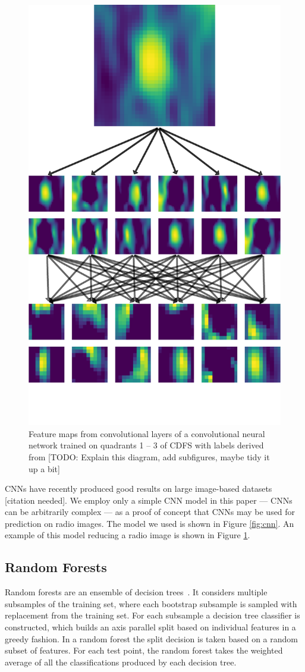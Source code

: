 \documentclass[fleqn,usenatbib,usedcolumn]{mnras}
\begin{document}
    \begin{figure}
    \centering
    \includegraphics[width=0.6\columnwidth]{convolutions_42191.pdf}
    \caption{Feature maps from convolutional layers of a convolutional neural
      network trained on quadrants 1 -- 3 of CDFS with labels derived from
      \citeauthor{norris06} [TODO: Explain this diagram, add subfigures, maybe tidy it up a bit]}
    \label{fig:cnn-outputs}
    \end{figure}

    CNNs have recently produced good results on large image-based datasets [citation needed]. We employ only a simple CNN model in this paper
    --- CNNs can be arbitrarily complex --- as a proof of concept that CNNs
    may be used for prediction on radio images. The model we used is shown
    in Figure \ref{fig:cnn}. An example of this model reducing a radio image is shown in Figure \ref{fig:cnn-outputs}.

  \subsection{Random Forests}\label{random-forests}

    Random forests are an ensemble of decision trees~\citep{breiman01random-forest}.
    It considers multiple subsamples
    of the training set, where each bootstrap subsample is sampled with replacement
    from the training set. For each subsample a decision tree classifier is constructed,
    which builds an axis parallel split based on individual features in a greedy fashion.
    In a random forest the split decision is taken based on a random subset of features.
    For each test point, the random forest takes the weighted average of all the
    classifications produced by each decision tree.
\end{document}
